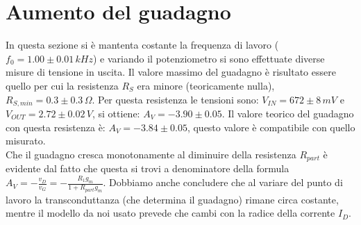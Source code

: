 \documentclass[10pt,a4paper]{article}
\begin{document}
\section{Aumento del guadagno}
In questa sezione si è mantenta costante la frequenza di lavoro ($f_0 = 1.00\pm0.01\, kHz$) e variando il potenziometro si sono effettuate diverse misure di tensione in uscita. Il valore massimo del guadagno è risultato essere quello per cui la resistenza $R_S$ era minore (teoricamente nulla), $R_{S, min} = 0.3 \pm 0.3 \, \Omega$. Per questa resistenza le tensioni  sono: $V_{IN} = 672\pm8 \, mV$ e $V_{OUT} = 2.72 \pm 0.02 \, V$, si ottiene:  $A_V = -3.90\pm0.05$. Il valore teorico del guadagno con questa resistenza è:  $A_V =-3.84\pm0.05$, questo valore è compatibile con quello misurato.\\
Che il guadagno cresca monotonamente al diminuire della resistenza $R_{part}$ è evidente dal fatto che questa si trovi a denominatore della formula $A_V = -\frac{v_D}{v_G} = - \frac{R_1 g_m}{1+R_{part} g_m}$. Dobbiamo anche concludere che al variare del punto di lavoro la transconduttanza (che determina il guadagno) rimane circa costante, mentre il modello da noi usato prevede che cambi con la radice della corrente $I_D$.
\end{document}
